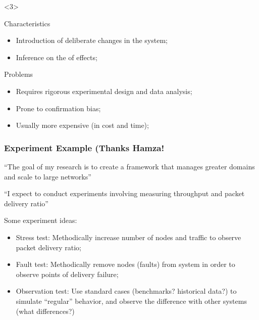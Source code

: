 \documentclass{beamer}
\begin{document}
\begin{frame}
\begin{onlyenv}<3>
  \begin{block}{Characteristics}
    \begin{itemize}
    \item Introduction of deliberate changes in the system;
    \item Inference on the  of effects;
    \end{itemize}
  \end{block}
  \begin{block}{Problems}
    \begin{itemize}
    \item Requires rigorous experimental design and data analysis;
    \item Prone to confirmation bias;
    \item Usually more expensive (in cost and time);
    \end{itemize}
  \end{block}
  \end{onlyenv}

\end{frame}

\begin{frame}
  \frametitle{Experiment Example (Thanks Hamza!}

  \begin{block}{}
    ``The goal of my research is to create a framework that manages
    greater domains and scale to large networks''
    \medskip

    ``I expect to conduct experiments involving measuring throughput
    and packet delivery ratio''
  \end{block}

  \bigskip

  Some experiment ideas:
  
  \begin{itemize}
  \item Stress test: Methodically increase number of nodes and traffic
    to observe packet delivery ratio;
  \item Fault test: Methodically remove nodes (faults) from system in
    order to observe points of delivery failure;
  \item Observation test: Use standard cases (benchmarks? historical
    data?) to simulate ``regular'' behavior, and observe the
    difference with other systems (what differences?)
  \end{itemize}
\end{frame}
\end{document}

